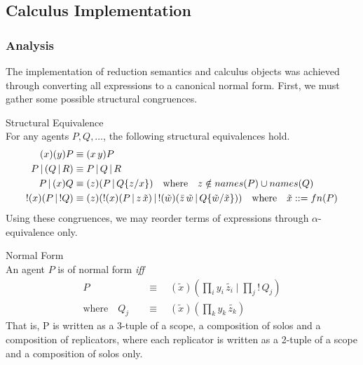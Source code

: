 \subsection{Calculus Implementation}\label{ssec:calculus-implementation}
    
    \subsubsection{Analysis}\label{sssec:calculus-analysis}
        The implementation of reduction semantics and calculus objects was achieved through converting all expressions to a canonical normal form.
        First, we must gather some possible structural congruences.

        \begin{lemma}{Structural Equivalence\\}
            For any agents $P, Q, \ldots$, the following structural equivalences hold.
            \begin{align*}
                (x)(y) P                & \equiv (x \, y) P \\
                P \, | \, (Q \, | \, R) & \equiv P \, | \, Q \, | \, R \\
                P \, | \, (x) Q         & \equiv (z)(P \, | \, Q\{z / x\}) \quad \text{where} \quad z \notin names(P) \cup names(Q) \\
                !(x)(P \, | \, !Q)      & \equiv (z)(!(x)(P \, | \, z \, \tilde{x}) \, | \, !(\tilde{w})(\bar{z} \, \tilde{w} \, | \, Q\{\tilde{w}/\tilde{x}\})) \quad \text{where} \quad \tilde{x} ::= fn(P)
            \end{align*}
            Using these congruences, we may reorder terms of expressions through $\alpha$-equivalence only.
        \end{lemma}

        \begin{definition}{Normal Form\\}
            An agent $P$ is of normal form \textit{iff}
            \begin{align*}
                                    P \quad &\equiv \quad (\tilde{x})(\prod_{i}{y_i \, \tilde{z_i}} \; | \; \prod_{j}{! \, Q_j}) \\
                \text{where} \quad Q_j \quad &\equiv \quad (\tilde{x})(\prod_{k}{y_k \, \tilde{z_k}})
            \end{align*}
            That is, P is written as a 3-tuple of a scope, a composition of solos and a composition of replicators, where each replicator is written as a 2-tuple of a scope and a composition of solos only.
        \end{definition}

